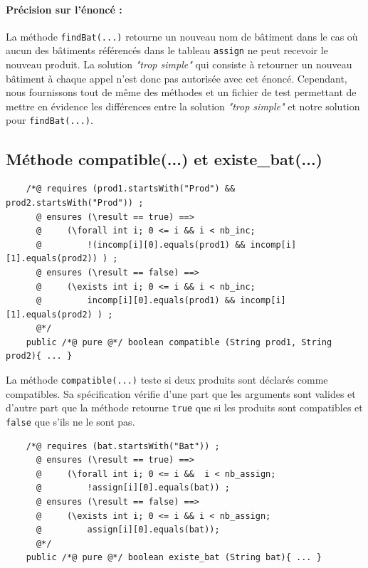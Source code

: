 \documentclass{article}
\begin{document}
\paragraph{Précision sur l'énoncé :} La méthode \texttt{findBat(...)} retourne un nouveau nom de bâtiment dans le cas où aucun des bâtiments référencés dans le tableau \texttt{assign} ne peut recevoir le nouveau produit. La solution \textit{"trop simple"} qui consiste à retourner un nouveau bâtiment à chaque appel n'est donc pas autorisée avec cet énoncé. Cependant, nous fournissons tout de même des méthodes et un fichier de test permettant de mettre en évidence les différences entre la solution \textit{"trop simple"} et notre solution pour \texttt{findBat(...)}.

\subsection{Méthode compatible(...) et existe\_bat(...)}

\noindent
\begin{verbatim}
    /*@ requires (prod1.startsWith("Prod") && prod2.startsWith("Prod")) ;
      @ ensures (\result == true) ==>
      @     (\forall int i; 0 <= i && i < nb_inc;
      @	        !(incomp[i][0].equals(prod1) && incomp[i][1].equals(prod2)) ) ;
      @ ensures (\result == false) ==>
      @	    (\exists int i; 0 <= i && i < nb_inc; 
      @	        incomp[i][0].equals(prod1) && incomp[i][1].equals(prod2) ) ;
      @*/
    public /*@ pure @*/ boolean compatible (String prod1, String prod2){ ... }
\end{verbatim}
\vspace{0.2cm}

\noindent
La méthode \texttt{compatible(...)} teste si deux produits sont déclarés comme compatibles. Sa spécification vérifie d'une part que les arguments sont valides et d'autre part que la méthode retourne \texttt{true} que si les produits sont compatibles et \texttt{false} que s'ils ne le sont pas.

\vspace{0.3cm}
\noindent
\begin{verbatim}
    /*@ requires (bat.startsWith("Bat")) ;
      @ ensures (\result == true) ==>
      @	    (\forall int i; 0 <= i &&  i < nb_assign;
      @	        !assign[i][0].equals(bat)) ;
      @ ensures (\result == false) ==>
      @     (\exists int i; 0 <= i && i < nb_assign;
      @	        assign[i][0].equals(bat)); 
      @*/
    public /*@ pure @*/ boolean existe_bat (String bat){ ... }
\end{verbatim}
\vspace{0.2cm}
\end{document}
